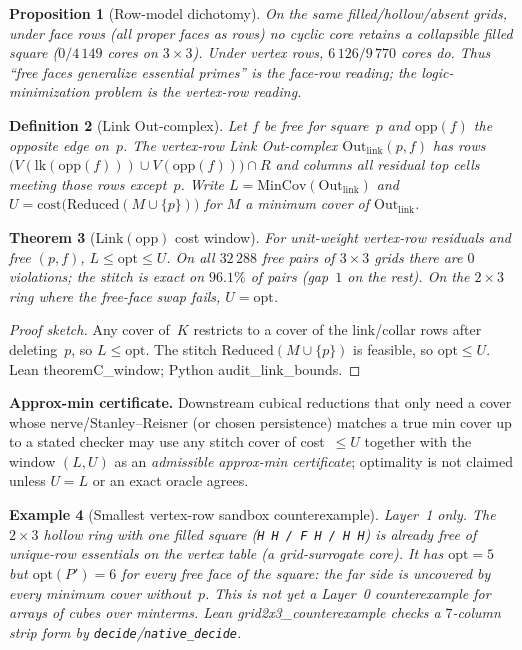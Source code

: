\documentclass[11pt]{article}
\newtheorem{theorem}{Theorem}
\newtheorem{definition}[theorem]{Definition}
\newtheorem{proposition}[theorem]{Proposition}
\newtheorem{example}[theorem]{Example}
\begin{document}
\begin{proposition}[Row-model dichotomy]
\label{prop:dichotomy}
On the same filled/hollow/absent grids, under \emph{face rows} (all proper faces
as rows) no cyclic core retains a collapsible filled square ($0/4\,149$ cores on
$3\times 3$).  Under vertex rows, $6\,126/9\,770$ cores do.  Thus ``free faces
generalize essential primes'' is the face-row reading; the logic-minimization
problem is the vertex-row reading.
\end{proposition}

\begin{definition}[Link Out-complex]
\label{def:link-out}
Let $f$ be free for square~$p$ and $\mathrm{opp}(f)$ the opposite edge on~$p$.
The vertex-row \emph{Link Out-complex} $\mathrm{Out}_{\mathrm{link}}(p,f)$ has
rows $\bigl(V(\mathrm{lk}(\mathrm{opp}(f)))\cup V(\mathrm{opp}(f))\bigr)\cap R$
and columns all residual top cells meeting those rows except~$p$.  Write
$L=\mathrm{MinCov}(\mathrm{Out}_{\mathrm{link}})$ and
$U=\mathrm{cost}\bigl(\mathrm{Reduced}(M\cup\{p\})\bigr)$ for
$M$ a minimum cover of $\mathrm{Out}_{\mathrm{link}}$.
\end{definition}

\begin{theorem}[Link$(\mathrm{opp})$ cost window]
\label{thm:link-bounds}
For unit-weight vertex-row residuals and free $(p,f)$,
$L\le\mathrm{opt}\le U$.  On all $32\,288$ free pairs of $3\times 3$ grids there
are $0$ violations; the stitch is exact on $96.1\%$ of pairs (gap~$1$ on the
rest).  On the $2\times 3$ ring where the free-face swap fails, $U=\mathrm{opt}$.
\end{theorem}

\begin{proof}[Proof sketch]
Any cover of~$K$ restricts to a cover of the link/collar rows after deleting~$p$,
so $L\le\mathrm{opt}$.  The stitch $\mathrm{Reduced}(M\cup\{p\})$ is feasible, so
$\mathrm{opt}\le U$.  Lean \textsf{theoremC\_window}; Python
\textsf{audit\_link\_bounds}.
\end{proof}

\noindent\textbf{Approx-min certificate.}  Downstream cubical reductions that only
need a cover whose nerve/Stanley--Reisner (or chosen persistence) matches a true
min cover up to a stated checker may use any stitch cover of cost~$\le U$ together
with the window $(L,U)$ as an \emph{admissible approx-min certificate}; optimality
is not claimed unless $U=L$ or an exact oracle agrees.

\begin{example}[Smallest vertex-row sandbox counterexample]
\label{ex:grid2x3}
\textit{Layer~1 only.}  The $2\times 3$ hollow ring with one filled square
(\texttt{H~H / F~H / H~H}) is already free of unique-row essentials on the vertex
table (a grid-surrogate core).  It has $\mathrm{opt}=5$ but $\mathrm{opt}(P')=6$ for
every free face of the square: the far side is uncovered by every minimum cover
without~$p$.  This is \emph{not} yet a Layer~0 counterexample for arrays of cubes
over minterms.  Lean \textsf{grid2x3\_counterexample} checks a $7$-column strip form
by \texttt{decide}/\texttt{native\_decide}.
\end{example}
\end{document}
